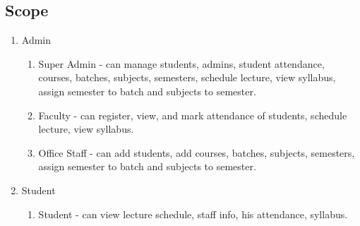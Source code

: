 \subsection{Scope}
\begin{enumerate}
    \item Admin
    \begin{enumerate}
        \item Super Admin - can manage students, admins, student attendance, courses, batches, subjects, semesters, schedule lecture, view syllabus, assign semester to batch and subjects to semester.
        \item Faculty - can register, view, and mark attendance of students, schedule lecture, view syllabus.
        \item Office Staff - can add students, add courses, batches, subjects, semesters, assign semester to batch and subjects to semester.
    \end{enumerate}
    \item Student
    \begin{enumerate}
        \item Student - can view lecture schedule, staff info, his attendance, syllabus.
    \end{enumerate}
\end{enumerate}

